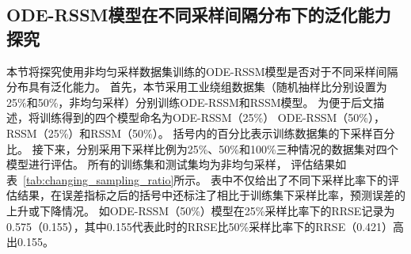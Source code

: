 \subsection{ODE-RSSM模型在不同采样间隔分布下的泛化能力探究}
本节将探究使用非均匀采样数据集训练的ODE-RSSM模型是否对于不同采样间隔分布具有泛化能力。
首先，本节采用工业绕组数据集（随机抽样比分别设置为25\%和50\%，非均匀采样）分别训练ODE-RSSM和RSSM模型。
为便于后文描述，将训练得到的四个模型命名为ODE-RSSM（25\%） ODE-RSSM（50\%）， RSSM（25\%）和RSSM（50\%）。
括号内的百分比表示训练数据集的下采样百分比。
接下来，分别采用下采样比例为25\%、50\%和100\%三种情况的数据集对四个模型进行评估。
所有的训练集和测试集均为非均匀采样，
评估结果如表~\ref{tab:changing_sampling_ratio}所示。
表中不仅给出了不同下采样比率下的评估结果，在误差指标之后的括号中还标注了相比于训练集下采样比率，预测误差的上升或下降情况。
如ODE-RSSM（50\%）模型在25\%采样比率下的RRSE记录为0.575（0.155），其中0.155代表此时的RRSE比50\%采样比率下的RRSE（0.421）高出0.155。


